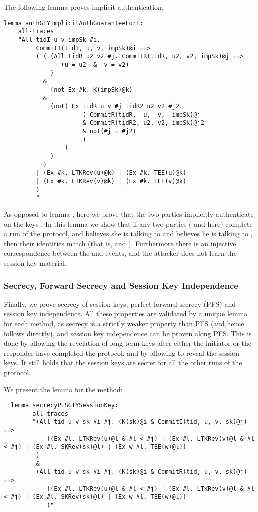 The following lemma proves implicit authentication:
\begin{lstlisting}
lemma authGIYImplicitAuthGuaranteeForI:
    all-traces
    "All tidI u v impSk #i.
         CommitI(tidI, u, v, impSk)@i ==>
         ( ( (All tidR u2 v2 #j. CommitR(tidR, u2, v2, impSk)@j ==>
                (u = u2  &  v = v2)
             )
           &
             (not Ex #k. K(impSk)@k)
           &
             (not( Ex tidR u v #j tidR2 u2 v2 #j2.
                      ( CommitR(tidR,  u,  v,  impSk)@j
                      & CommitR(tidR2, u2, v2, impSk)@j2
                      & not(#j = #j2)
                      )
                 )
             )
           )
         | (Ex #k. LTKRev(u)@k) | (Ex #k. TEE(u)@k)
         | (Ex #k. LTKRev(v)@k) | (Ex #k. TEE(v)@k)
         )
         "
\end{lstlisting}

As opposed to lemma , here we prove that the two
parties implicitly authenticate on the keys . %
In this lemma we show that if any two parties ( and  here) complete
a run of the protocol, and  believes she is talking to  and 
believes he is talking to , then their identities match (that is,
 and ). Furthermore there is an injective correspondence
between the  and  events, and the attacker does not
learn the session key material.

\spacehack
\subsubsection{Secrecy, Forward Secrecy and Session Key Independence}

Finally, we prove secrecy of session keys, perfect forward secrecy
(PFS) and session key independence.
%
All these properties are validated by a unique lemma for each method,
as secrecy is a strictly weaker property than PFS (and hence follows
directly), and session key independence can be proven along PFS.
%
This is done by allowing the revelation of long term keys after either
the initiator or the responder have completed the protocol, and by
allowing to reveal the session keys.
%
It still holds that the session keys are secret for all the other runs
of the protocol.

We present the lemma for the \mSigStat{} method:
\begin{lstlisting}
  lemma secrecyPFSGIYSessionKey:
        all-traces
        "(All tid u v sk #i #j. (K(sk)@i & CommitI(tid, u, v, sk)@j) ==>
            ((Ex #l. LTKRev(u)@l & #l < #j) | (Ex #l. LTKRev(v)@l & #l < #j) | (Ex #l. SKRev(sk)@l) | (Ex w #l. TEE(w)@l))
         )
         &
         (All tid u v sk #i #j. (K(sk)@i & CommitR(tid, u, v, sk)@j) ==>
            ((Ex #l. LTKRev(u)@l & #l < #j) | (Ex #l. LTKRev(v)@l & #l < #j) | (Ex #l. SKRev(sk)@l) | (Ex w #l. TEE(w)@l))
            )"
\end{lstlisting}

